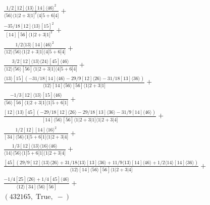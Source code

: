 \documentclass[varwidth, border=5pt]{standalone}
\begin{document}
\begin{my}
$\begin{gathered}
\scriptscriptstyle\frac{1/2[12]⟨13⟩[14]⟨46⟩^2}{⟨56⟩⟨1|2+3|1]^2⟨4|5+6|4]}+\\
\scriptscriptstyle\frac{-35/18[12]⟨13⟩[15]^2}{[14][56]⟨1|2+3|1]^2}+\\
\scriptscriptstyle\frac{1/2⟨13⟩[14]⟨46⟩^2}{⟨12⟩⟨56⟩⟨1|2+3|1]⟨4|5+6|4]}+\\
\scriptscriptstyle\frac{3/2[12]⟨13⟩⟨24⟩[45]⟨46⟩}{⟨12⟩⟨56⟩[56]⟨1|2+3|1]⟨4|5+6|4]}+\\
\scriptscriptstyle\frac{⟨13⟩[15](-31/18[14]⟨46⟩-29/9[12]⟨26⟩-31/18[13]⟨36⟩)}{⟨12⟩[14]⟨56⟩[56]⟨1|2+3|1]}+\\
\scriptscriptstyle\frac{-1/3[12]⟨13⟩[15]⟨46⟩}{⟨56⟩[56]⟨1|2+3|1]⟨1|5+6|1]}+\\
\scriptscriptstyle\frac{[12]⟨13⟩[45](-29/18[12]⟨26⟩-29/18[13]⟨36⟩-31/9[14]⟨46⟩)}{[14]⟨56⟩[56]⟨1|2+3|1]⟨1|2+3|4]}+\\
\scriptscriptstyle\frac{1/2[12][14]⟨16⟩^2}{[34]⟨56⟩⟨1|5+6|1]⟨1|2+3|4]}+\\
\scriptscriptstyle\frac{1/3[12]⟨13⟩⟨16⟩⟨46⟩}{⟨14⟩⟨56⟩⟨1|5+6|1]⟨1|2+3|4]}+\\
\scriptscriptstyle\frac{[45](29/9[12]⟨13⟩⟨26⟩+31/18⟨13⟩[13]⟨36⟩+11/9⟨13⟩[14]⟨46⟩+1/2⟨14⟩[14]⟨36⟩)}{⟨12⟩[14]⟨56⟩[56]⟨1|2+3|4]}+\\
\scriptscriptstyle\frac{-1/4[25]⟨26⟩+1/4[45]⟨46⟩}{⟨12⟩[34]⟨56⟩[56]}+\\
\scriptscriptstyle(432165,\;\text{True},\;-)\phantom{+}
\end{gathered}$
\end{my}
\end{document}
